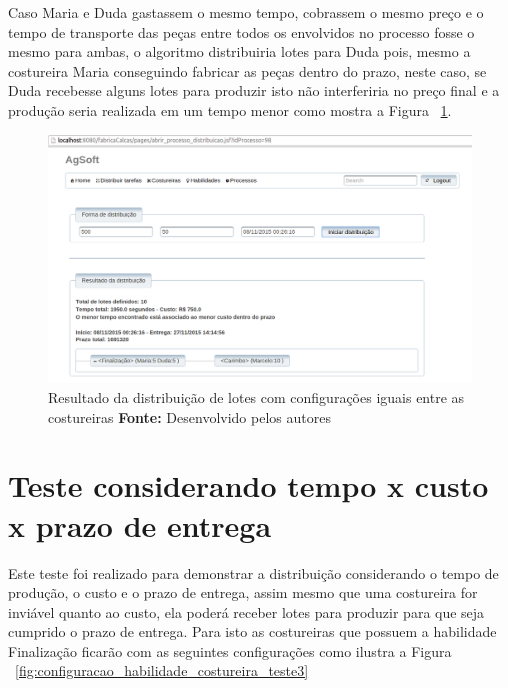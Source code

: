 \par Caso Maria e Duda gastassem o mesmo tempo, cobrassem o mesmo preço e o tempo de
transporte das peças entre todos os envolvidos no processo fosse o mesmo para ambas, 
o algoritmo distribuiria lotes para Duda pois, mesmo a costureira Maria
conseguindo fabricar as peças dentro do prazo, neste caso, se Duda recebesse alguns lotes para produzir
isto não interferiria no preço final e a produção seria realizada em um tempo menor como mostra a Figura
~\ref{fig:resultado_tudo_igual}.

\newpage

\begin{figure}[h!]
	\centerline{\includegraphics[scale=0.4]{./imagens/resultado_tudo_igual_teste2.png}}
	\caption[Resultado da distribuição de lotes com configurações iguais entre as
	costureiras] 
	{Resultado da distribuição de lotes com configurações iguais entre as
	costureiras \textbf{Fonte:}
	Desenvolvido pelos autores}
	\label{fig:resultado_tudo_igual}
\end{figure}

\section{Teste considerando tempo x custo x prazo de entrega}

\par Este teste foi realizado para demonstrar a distribuição considerando o tempo de
produção, o custo e o prazo de entrega, assim mesmo que uma costureira for inviável 
quanto ao custo, ela poderá receber lotes para produzir para que seja cumprido o prazo 
de entrega. Para isto as costureiras que possuem a habilidade Finalização ficarão com
as seguintes configurações como ilustra a Figura ~\ref{fig:configuracao_habilidade_costureira_teste3}

